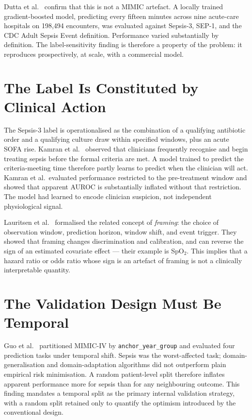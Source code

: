 Dutta et al.\ \parencite{dutta2026performance} confirm that this is not a
MIMIC artefact. A locally trained gradient-boosted model, predicting every fifteen
minutes across nine acute-care hospitals on 198{,}494 encounters, was evaluated
against Sepsis-3, SEP-1, and the CDC Adult Sepsis Event definition. Performance
varied substantially by definition. The label-sensitivity finding is therefore a
property of the problem: it reproduces prospectively, at scale, with a commercial
model.

\section{The Label Is Constituted by Clinical Action}

The Sepsis-3 label is operationalised as the combination of a qualifying
antibiotic order and a qualifying culture draw within specified windows, plus an
acute SOFA rise. Kamran et al.\ \parencite{kamran2024evaluation} observed that
clinicians frequently recognise and begin treating sepsis before the formal
criteria are met. A model trained to predict the criteria-meeting time therefore
partly learns to predict when the clinician will act. Kamran et al.\ evaluated
performance restricted to the pre-treatment window and showed that apparent AUROC
is substantially inflated without that restriction. The model had learned to
encode clinician suspicion, not independent physiological signal.

Lauritsen et al.\ \parencite{lauritsen2021framing} formalised the related
concept of \textit{framing}: the choice of observation window, prediction horizon,
window shift, and event trigger. They showed that framing changes discrimination
and calibration, and can reverse the sign of an estimated covariate effect ---
their example is SpO$_2$. This implies that a hazard ratio or odds ratio whose
sign is an artefact of framing is not a clinically interpretable quantity.

\section{The Validation Design Must Be Temporal}

Guo et al.\ \parencite{guo2022temporal} partitioned MIMIC-IV by
\texttt{anchor\_year\_group} and evaluated four prediction tasks under temporal
shift. Sepsis was the worst-affected task; domain-generalisation and
domain-adaptation algorithms did not outperform plain empirical risk minimisation.
A random patient-level split therefore inflates apparent performance more for
sepsis than for any neighbouring outcome. This finding mandates a temporal split
as the primary internal validation strategy, with a random split retained only to
quantify the optimism introduced by the conventional design.

